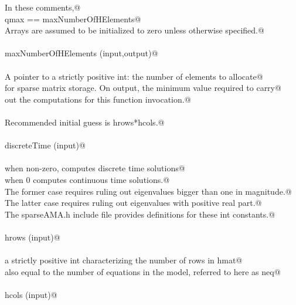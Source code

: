 \documentclass[12pt]{article}
\begin{document}
\begin{flushleft}
\begin{minipage}{\linewidth}
\begin{list}{}{}
\mbox{}\verb@        In these comments,@\\
\mbox{}\verb@                        qmax == maxNumberOfHElements@\\
\mbox{}\verb@        Arrays are assumed to be initialized to zero unless otherwise specified.@\\
\mbox{}\verb@@\\
\mbox{}\verb@        maxNumberOfHElements (input,output)@\\
\mbox{}\verb@@\\
\mbox{}\verb@                A pointer to a strictly positive int:  the number of elements to allocate@\\
\mbox{}\verb@                for sparse matrix storage. On output, the minimum value required to carry@\\
\mbox{}\verb@                out the computations for this function invocation.@\\
\mbox{}\verb@@\\
\mbox{}\verb@                Recommended initial guess is hrows*hcols.@\\
\mbox{}\verb@@\\
\mbox{}\verb@        discreteTime (input)@\\
\mbox{}\verb@@\\
\mbox{}\verb@                when non-zero, computes discrete time solutions@\\
\mbox{}\verb@                when 0 computes continuous time solutions.@\\
\mbox{}\verb@                The former case requires ruling out eigenvalues bigger than one in magnitude.@\\
\mbox{}\verb@                The latter case requires ruling out eigenvalues with positive real part.@\\
\mbox{}\verb@                The sparseAMA.h include file provides definitions for these int constants.@\\
\mbox{}\verb@@\\
\mbox{}\verb@        hrows (input)@\\
\mbox{}\verb@@\\
\mbox{}\verb@                a strictly positive int characterizing the number of rows in hmat@\\
\mbox{}\verb@                also equal to the number of equations in the model, referred to here as neq@\\
\mbox{}\verb@@\\
\mbox{}\verb@        hcols (input)@\\

\end{list}
\end{minipage}
\end{flushleft}
\end{document}
